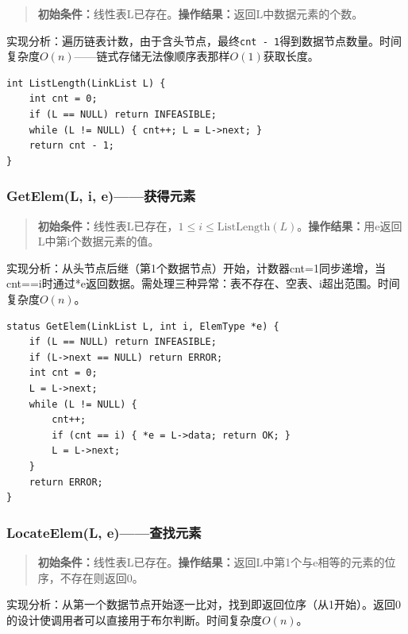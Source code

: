 \documentclass[supercite]{Experimental_Report}
\begin{document}
\begin{quote}\small
\textbf{初始条件：}线性表L已存在。\quad\textbf{操作结果：}返回L中数据元素的个数。
\end{quote}

实现分析：遍历链表计数，由于含头节点，最终\texttt{cnt - 1}得到数据节点数量。时间复杂度$O(n)$——链式存储无法像顺序表那样$O(1)$获取长度。

\begin{lstlisting}[label={lst:len}, caption={ListLength}]
int ListLength(LinkList L) {
    int cnt = 0;
    if (L == NULL) return INFEASIBLE;
    while (L != NULL) { cnt++; L = L->next; }
    return cnt - 1;
}
\end{lstlisting}

\subsubsection{GetElem(L, i, e)——获得元素}

\begin{quote}\small
\textbf{初始条件：}线性表L已存在，$1\leq i\leq\text{ListLength}(L)$。\quad\textbf{操作结果：}用e返回L中第i个数据元素的值。
\end{quote}

实现分析：从头节点后继（第1个数据节点）开始，计数器cnt=1同步递增，当cnt==i时通过*e返回数据。需处理三种异常：表不存在、空表、i超出范围。时间复杂度$O(n)$。

\begin{lstlisting}[label={lst:getelem}, caption={GetElem}]
status GetElem(LinkList L, int i, ElemType *e) {
    if (L == NULL) return INFEASIBLE;
    if (L->next == NULL) return ERROR;
    int cnt = 0;
    L = L->next;
    while (L != NULL) {
        cnt++;
        if (cnt == i) { *e = L->data; return OK; }
        L = L->next;
    }
    return ERROR;
}
\end{lstlisting}

\subsubsection{LocateElem(L, e)——查找元素}

\begin{quote}\small
\textbf{初始条件：}线性表L已存在。\quad\textbf{操作结果：}返回L中第1个与e相等的元素的位序，不存在则返回0。
\end{quote}

实现分析：从第一个数据节点开始逐一比对，找到即返回位序（从1开始）。返回0的设计使调用者可以直接用于布尔判断。时间复杂度$O(n)$。
\end{document}
